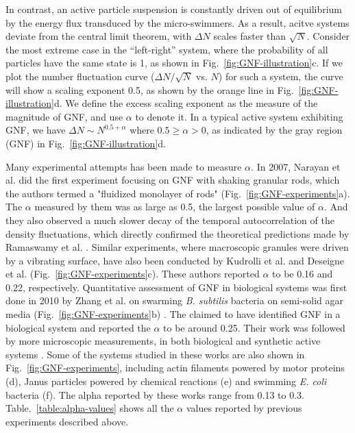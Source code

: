 In contrast, an active particle suspension is constantly driven out of equilibrium by the energy flux transduced by the micro-swimmers.
As a result, acitve systems deviate from the central limit theorem, with $\Delta N$ scales faster than $\sqrt N$.
Consider the most extreme case in the ``left-right'' system, where the probability of all particles have the same state is 1, as shown in Fig.~\ref{fig:GNF-illustration}c.
If we plot the number fluctuation curve ($\Delta N/\sqrt N$ vs. $N$) for such a system, the curve will show a scaling exponent 0.5, as shown by the orange line in Fig.~\ref{fig:GNF-illustration}d.
We define the excess scaling exponent as the measure of the magnitude of GNF, and use $\alpha$ to denote it.
In a typical active system exhibiting GNF, we have $\Delta N \sim N^{0.5+\alpha}$ where $0.5\ge\alpha>0$, as indicated by the gray region (GNF) in Fig.~\ref{fig:GNF-illustration}d.

Many experimental attempts has been made to measure $\alpha$. In 2007, Narayan et al. did the first experiment focusing on GNF with shaking granular rods, which the authors termed a "fluidized monolayer of rods" (Fig.~\ref{fig:GNF-experiments}a)\cite{Narayan2007}. The $\alpha$ measured by them was as large as 0.5, the largest possible value of $\alpha$. And they also observed a much slower decay of the temporal autocorrelation of the density fluctuations, which directly confirmed the theoretical predictions made by Ramaswamy et al. \cite{Ramaswamy2003}.
Similar experiments, where macroscopic granules were driven by a vibrating surface, have also been conducted by Kudrolli et al. \cite{Kudrolli2008} and Deseigne et al. (Fig.~\ref{fig:GNF-experiments}c)\cite{Deseigne2010}. These authors reported $\alpha$ to be 0.16 and 0.22, respectively.
Quantitative assessment of GNF in biological systems was first done in 2010 by Zhang et al. on swarming \textit{B. subtilis} bacteria on semi-solid agar media (Fig.~\ref{fig:GNF-experiments}b) \cite{Zhang2010}.
The claimed to have identified GNF in a biological system and reported the $\alpha$ to be around 0.25.
Their work was followed by more microscopic measurements, in both biological and synthetic active systems \cite{Schaller2013, Palacci2013, Kawaguchi2017, Nishiguchi2017, Karani2019}.
Some of the systems studied in these works are also shown in Fig.~\ref{fig:GNF-experiments}, including actin filaments powered by motor proteins (d), Janus particles powered by chemical reactions (e) and swimming \textit{E. coli} bacteria (f).
The alpha reported by these works range from 0.13 to 0.3.
Table.~\ref{table:alpha-values} shows all the $\alpha$ values reported by previous experiments described above.

